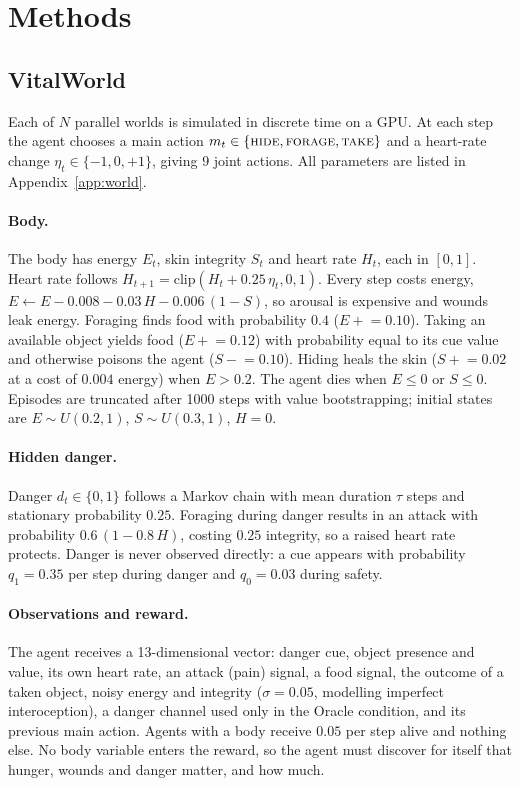\documentclass[11pt]{article}
\begin{document}
\section{Methods}
\label{sec:methods}

\subsection{VitalWorld}

Each of $N$ parallel worlds is simulated in discrete time on a GPU. At each step the agent chooses a main action $m_t\in\{\textsc{hide},\textsc{forage},\textsc{take}\}$ and a heart-rate change $\eta_t\in\{-1,0,+1\}$, giving 9 joint actions. All parameters are listed in Appendix~\ref{app:world}.

\paragraph{Body.} The body has energy $E_t$, skin integrity $S_t$ and heart rate $H_t$, each in $[0,1]$. Heart rate follows $H_{t+1}=\mathrm{clip}(H_t+0.25\,\eta_t,0,1)$. Every step costs energy, $E \leftarrow E - 0.008 - 0.03\,H - 0.006\,(1-S)$, so arousal is expensive and wounds leak energy. Foraging finds food with probability $0.4$ ($E \mathrel{+}= 0.10$). Taking an available object yields food ($E \mathrel{+}= 0.12$) with probability equal to its cue value and otherwise poisons the agent ($S \mathrel{-}= 0.10$). Hiding heals the skin ($S \mathrel{+}= 0.02$ at a cost of $0.004$ energy) when $E>0.2$. The agent dies when $E\le 0$ or $S\le 0$. Episodes are truncated after 1000 steps with value bootstrapping; initial states are $E\sim U(0.2,1)$, $S\sim U(0.3,1)$, $H=0$.

\paragraph{Hidden danger.} Danger $d_t\in\{0,1\}$ follows a Markov chain with mean duration $\tau$ steps and stationary probability $0.25$. Foraging during danger results in an attack with probability $0.6\,(1-0.8\,H)$, costing $0.25$ integrity, so a raised heart rate protects. Danger is never observed directly: a cue appears with probability $q_1=0.35$ per step during danger and $q_0=0.03$ during safety.

\paragraph{Observations and reward.} The agent receives a 13-dimensional vector: danger cue, object presence and value, its own heart rate, an attack (pain) signal, a food signal, the outcome of a taken object, noisy energy and integrity ($\sigma=0.05$, modelling imperfect interoception), a danger channel used only in the Oracle condition, and its previous main action. Agents with a body receive $0.05$ per step alive and nothing else. No body variable enters the reward, so the agent must discover for itself that hunger, wounds and danger matter, and how much.
\end{document}

